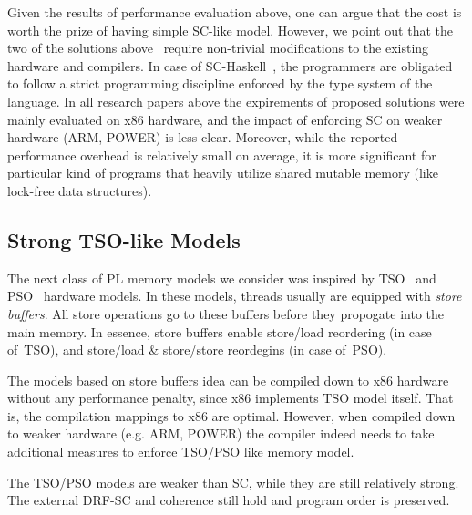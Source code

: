 
Given the results of performance evaluation above,
one can argue that the cost is worth the prize
of having simple SC-like model.
However, we point out that the two 
of the solutions above~\cite{Singh-el:ISCA12, Marino-el:PLDI10} 
require non-trivial modifications to the 
existing hardware and compilers.
In case of SC-Haskell~\cite{Vollmer-el:PPoPP17}, 
the programmers are obligated to follow 
a strict programming discipline enforced 
by the type system of the language.
In all research papers above  the expirements 
of proposed solutions were mainly evaluated on x86 hardware, 
and the impact of enforcing SC on weaker hardware
(ARM, POWER) is less clear.
Moreover, while the reported performance overhead 
is relatively small on average, 
it is more significant for particular 
kind of programs that heavily utilize shared 
mutable memory (like lock-free data structures).

\subsection{Strong TSO-like Models}

The next class of PL memory models we consider 
was inspired by TSO~\cite{Sewell-al:CACM10} and PSO~\cite{Sparc:94} 
hardware models. In these models, threads usually 
are equipped with \emph{store buffers}.
All store operations go to these buffers before they 
propogate into the main memory.  
In essence, store buffers enable 
store/load reordering (in case of~TSO),
and store/load \& store/store reordegins (in case of~PSO).

The models based on store buffers idea 
can be compiled down to x86 hardware without any 
performance penalty, since x86 implements TSO model itself.
That is, the compilation mappings to x86 are optimal.
However, when compiled down to weaker hardware (e.g. ARM, POWER)
the compiler indeed needs to take additional measures 
to enforce TSO/PSO like memory model.

The TSO/PSO models are weaker than SC, while 
they are still relatively strong.
The external DRF-SC and coherence still hold
and program order is preserved.

